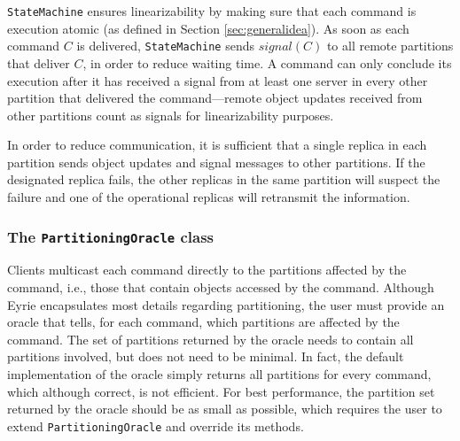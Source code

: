 \documentclass[10pt, conference, compsocconf, letterpaper]{IEEEtranv17}
\begin{document}
\verb#StateMachine# ensures linearizability by making sure that each command is execution atomic (as defined in Section \ref{sec:generalidea}). 
As soon as each command $C$ is delivered, \verb#StateMachine# sends $signal(C)$ to all remote partitions that deliver $C$, in order to reduce waiting time.
A command can only conclude its execution after it has received a signal from at least one server in every other partition that delivered the command---remote object updates received from other partitions count as signals for linearizability purposes.
%
%


In order to reduce communication, it is sufficient that a single replica in each partition sends object updates and signal messages to other partitions.
If the designated replica fails, the other replicas in the same partition will suspect the failure and one of the operational replicas will retransmit the information.


\subsubsection{The \texttt{PartitioningOracle} class}

Clients multicast each command directly to the partitions affected by the command, i.e., those that contain objects accessed by the command. 
Although Eyrie encapsulates most details regarding partitioning, the user must provide an oracle that tells, for each command, which partitions are affected by the command. 
The set of partitions returned by the oracle needs to contain all partitions involved, but does not need to be minimal. 
In fact, the default implementation of the oracle simply returns all partitions for every command, which although correct, is not efficient. 
For best performance, the partition set returned by the oracle should be as small as possible, which requires the user to extend \verb#PartitioningOracle# and override its methods.
\end{document}
